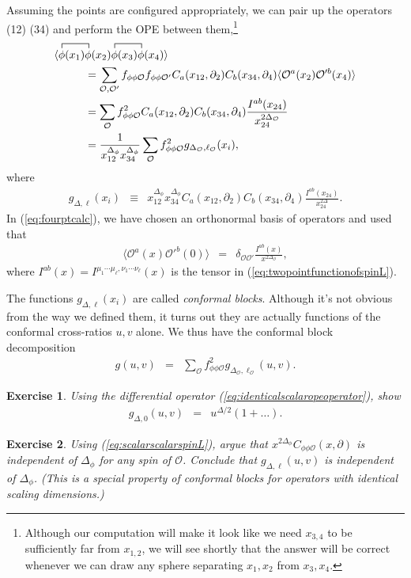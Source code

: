 \documentclass{ws-rv9x6}
\newcommand\be{\begin{eqnarray}}
\newcommand\ee{\end{eqnarray}}
\newcommand\f\phi
\newcommand\cO{\mathcal{O}}
\newcommand\p[1]{\left(#1\right)}
\newcommand\ptl\partial
\newcommand\<\langle
\renewcommand\>\rangle
\newcommand\de\delta
\newcommand\nn{\nonumber}
\renewcommand\.{\cdot}
\newcommand\De{\Delta}
\newtheorem{exercise}{Exercise}[section]
\begin{document}
Assuming the points are configured appropriately, we can pair up the operators (12) (34) and perform the OPE between them,\footnote{Although our computation will make it look like we need $x_{3,4}$ to be sufficiently far from $x_{1,2}$, we will see shortly that the answer will be correct whenever we can draw any sphere separating $x_1,x_2$ from $x_3,x_4$.}
\begin{align}
\label{eq:fourptcalc}
\<
\contraction{}{\f}{(x_1)}{\f}
\f(x_1)&\f(x_2)
\contraction{}{\f}{(x_1)}{\f}
\f(x_3)\f(x_4)
\>\nn\\
&= \sum_{\cO,\cO'}f_{\f\f\cO}f_{\f\f\cO'} C_a(x_{12},\ptl_2)C_b(x_{34},\ptl_4)\<\cO^a(x_2)\cO'^b(x_4)\>\nn\\
&= \sum_\cO f_{\f\f\cO}^2 C_a(x_{12},\ptl_2)C_b(x_{34},\ptl_4)\frac{I^{ab}(x_{24})}{x_{24}^{2\De_\cO}}\nn\\
&= \frac{1}{x_{12}^{\De_\f} x_{34}^{\De_\f}}\sum_\cO f_{\f\f\cO}^2 g_{\De_\cO,\ell_\cO}(x_i),
\end{align}
where
\be
\label{eq:olddefinitionofg}
g_{\De,\ell}(x_i) &\equiv& x_{12}^{\De_\f} x_{34}^{\De_\f} C_a(x_{12},\ptl_2)C_b(x_{34},\ptl_4)\frac{I^{ab}(x_{24})}{x_{24}^{2\De}}.
\ee
In (\ref{eq:fourptcalc}), we have chosen an orthonormal basis of operators and used that
\be
\label{eq:canonicallynormalizedtwopt}
\<\cO^a(x)\cO'^b(0)\> &=& \de_{\cO\cO'} \frac{I^{ab}(x)}{x^{2\De_\cO}},
\ee
where $I^{ab}(x)=I^{\mu_1\cdots\mu_\ell,\nu_1\cdots\nu_\ell}(x)$ is the tensor in (\ref{eq:twopointfunctionofspinL}).

The functions $g_{\De,\ell}(x_i)$ are called {\it conformal blocks}.  Although it's not obvious from the way we defined them, it turns out they are actually functions of the conformal cross-ratios $u,v$ alone.  We thus have the conformal block decomposition
\be
g(u,v) &=& \sum_\cO f_{\f\f\cO}^2 g_{\De_\cO,\ell_\cO}(u,v).
\ee
\begin{exercise}
Using the differential operator (\ref{eq:identicalscalaropeoperator}), show
\be
\label{eq:boundaryconditionforblock}
g_{\De,0}(u,v) &=& u^{\De/2}\p{1+\dots}.
\ee
\end{exercise}

\begin{exercise}
Using (\ref{eq:scalarscalarspinL}), argue that $x^{2\De_\f} C_{\f\f\cO}(x,\ptl)$ is independent of $\Delta_\phi$ for any spin of $\cO$. Conclude that $g_{\De,\ell}(u,v)$ is independent of $\Delta_\phi$. (This is a special property of conformal blocks for operators with identical scaling dimensions.)
\end{exercise}
\end{document}

